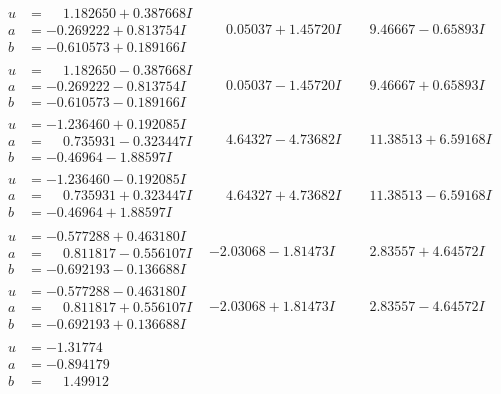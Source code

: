 \documentclass[1p]{elsarticle_modified}
\theoremstyle{definition}
\begin{document}
$$\begin{array}{c|c|c}
\begin{aligned}
u &= \phantom{-}1.182650 + 0.387668 I \\
a &= -0.269222 + 0.813754 I \\
b &= -0.610573 + 0.189166 I\end{aligned}
 & \phantom{-}0.05037 + 1.45720 I & \phantom{-}9.46667 - 0.65893 I \\ \hline\begin{aligned}
u &= \phantom{-}1.182650 - 0.387668 I \\
a &= -0.269222 - 0.813754 I \\
b &= -0.610573 - 0.189166 I\end{aligned}
 & \phantom{-}0.05037 - 1.45720 I & \phantom{-}9.46667 + 0.65893 I \\ \hline\begin{aligned}
u &= -1.236460 + 0.192085 I \\
a &= \phantom{-}0.735931 - 0.323447 I \\
b &= -0.46964 - 1.88597 I\end{aligned}
 & \phantom{-}4.64327 - 4.73682 I & \phantom{-}11.38513 + 6.59168 I \\ \hline\begin{aligned}
u &= -1.236460 - 0.192085 I \\
a &= \phantom{-}0.735931 + 0.323447 I \\
b &= -0.46964 + 1.88597 I\end{aligned}
 & \phantom{-}4.64327 + 4.73682 I & \phantom{-}11.38513 - 6.59168 I \\ \hline\begin{aligned}
u &= -0.577288 + 0.463180 I \\
a &= \phantom{-}0.811817 - 0.556107 I \\
b &= -0.692193 - 0.136688 I\end{aligned}
 & -2.03068 - 1.81473 I & \phantom{-}2.83557 + 4.64572 I \\ \hline\begin{aligned}
u &= -0.577288 - 0.463180 I \\
a &= \phantom{-}0.811817 + 0.556107 I \\
b &= -0.692193 + 0.136688 I\end{aligned}
 & -2.03068 + 1.81473 I & \phantom{-}2.83557 - 4.64572 I \\ \hline\begin{aligned}
u &= -1.31774\phantom{ +0.000000I} \\
a &= -0.894179\phantom{ +0.000000I} \\
b &= \phantom{-}1.49912\phantom{ +0.000000I}\end{aligned}

\end{array}$$
\end{document}
